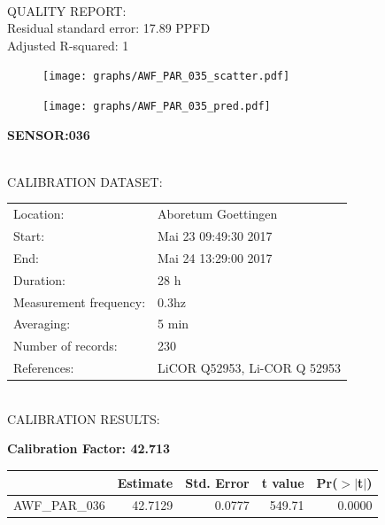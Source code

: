 \documentclass[oneside]{report}
\begin{document}
\hrulefill\\
QUALITY REPORT:\\
Residual standard error: 17.89 PPFD\\
Adjusted R-squared: 1



\begin{figure}[H]
  \centering
  \texttt{[image: graphs/AWF\_PAR\_035\_scatter.pdf]}
\end{figure}




\begin{figure}[H]
  \centering
  \texttt{[image: graphs/AWF\_PAR\_035\_pred.pdf]}
\end{figure}

\pagebreak


\begin{center}
\large{\textbf{SENSOR:036}}\\
\end{center}

\hrulefill\\
CALIBRATION DATASET:\\
\begin{table}[h!]
  \centering
  \label{tab:table1}
  \begin{tabular}{ll}
    Location: & Aboretum Goettingen\\ 
    
    
    Start:  & Mai 23 09:49:30 2017 \\
    End:   & Mai 24 13:29:00 2017\\ 
    Duration: & 28 h\\
    Measurement frequency: & 0.3hz\\
    Averaging:  &5 min\\
    Number of records: & 230 \\
    References: & LiCOR Q52953, Li-COR Q 52953 \\
  \end{tabular}
\end{table}

\hrulefill\\
CALIBRATION RESULTS:\\


\begin{center}
\textbf{\large{Calibration Factor: 42.713}}\\
\end{center}
\begin{table}[ht]
\centering
\begin{tabular}{rrrrr}
  \hline
 & Estimate & Std. Error & t value & Pr($>$$|$t$|$) \\ 
  \hline
AWF\_PAR\_036 & 42.7129 & 0.0777 & 549.71 & 0.0000 \\ 
   \hline
\end{tabular}
\end{table}
\end{document}
